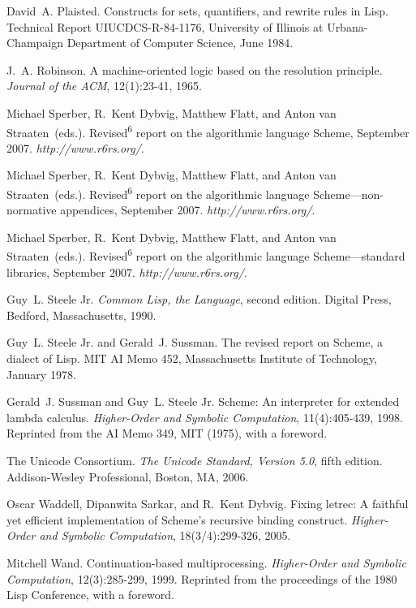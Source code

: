 David A. Plaisted.
Constructs for sets, quantifiers, and rewrite rules in Lisp.
Technical Report UIUCDCS-R-84-1176, University of Illinois at
  Urbana-Champaign Department of Computer Science, June 1984.


J. A. Robinson.
A machine-oriented logic based on the resolution principle.
\textit{Journal of the ACM}, 12(1):23-41, 1965.


Michael Sperber, R. Kent Dybvig, Matthew Flatt, and Anton van Straaten (eds.).
Revised\textsuperscript{6} report on the algorithmic language Scheme, September
  2007.
 \textit{http://www.r6rs.org/}.
 
Michael Sperber, R. Kent Dybvig, Matthew Flatt, and Anton van Straaten (eds.).
Revised\textsuperscript{6} report on the algorithmic language
  Scheme---non-normative appendices, September 2007.
 \textit{http://www.r6rs.org/}.
 
Michael Sperber, R. Kent Dybvig, Matthew Flatt, and Anton van Straaten (eds.).
Revised\textsuperscript{6} report on the algorithmic language Scheme---standard
  libraries, September 2007.
 \textit{http://www.r6rs.org/}.
 
Guy L. Steele Jr.
\textit{Common Lisp, the Language}, second edition.
Digital Press, Bedford, Massachusetts, 1990.


Guy L. Steele Jr. and Gerald J. Sussman.
The revised report on Scheme, a dialect of Lisp.
MIT AI Memo 452, Massachusetts Institute of Technology, January 1978.


Gerald J. Sussman and Guy L. Steele Jr.
Scheme: An interpreter for extended lambda calculus.
\textit{Higher-Order and Symbolic Computation}, 11(4):405-439, 1998.
Reprinted from the AI Memo 349, MIT (1975), with a foreword.


The Unicode Consortium.
\textit{The Unicode Standard, Version 5.0}, fifth edition.
Addison-Wesley Professional, Boston, MA, 2006.


Oscar Waddell, Dipanwita Sarkar, and R. Kent Dybvig.
Fixing letrec: A faithful yet efficient implementation of Scheme's
  recursive binding construct.
\textit{Higher-Order and Symbolic Computation}, 18(3/4):299-326, 2005.


Mitchell Wand.
Continuation-based multiprocessing.
\textit{Higher-Order and Symbolic Computation}, 12(3):285-299, 1999.
Reprinted from the proceedings of the 1980 Lisp Conference, with a
  foreword.




